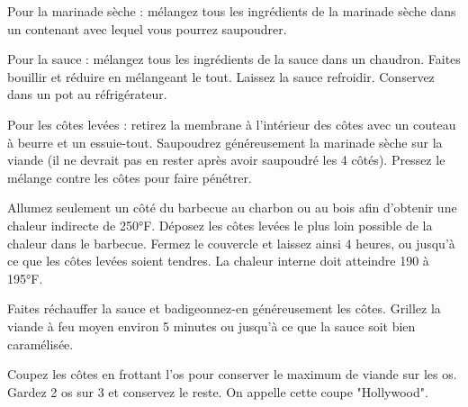 \begin{steps}
    \item Pour la marinade sèche : mélangez tous les ingrédients de la marinade sèche dans un contenant avec lequel vous pourrez saupoudrer.
    \item Pour la sauce : mélangez tous les ingrédients de la sauce dans un chaudron. Faites bouillir et réduire en mélangeant le tout. Laissez la sauce refroidir. Conservez dans un pot au réfrigérateur.
    \item Pour les côtes levées : retirez la membrane à l'intérieur des côtes avec un couteau à beurre et un essuie-tout. Saupoudrez généreusement la marinade sèche sur la viande (il ne devrait pas en rester après avoir saupoudré les 4 côtés). Pressez le mélange contre les côtes pour faire pénétrer.
    \item Allumez seulement un côté du barbecue au charbon ou au bois afin d'obtenir une chaleur indirecte de 250°F. Déposez les côtes levées le plus loin possible de la chaleur dans le barbecue. Fermez le couvercle et laissez ainsi 4 heures, ou jusqu'à ce que les côtes levées soient tendres. La chaleur interne doit atteindre 190 à 195°F.
    \item Faites réchauffer la sauce et badigeonnez-en généreusement les côtes. Grillez la viande à feu moyen environ 5 minutes ou jusqu'à ce que la sauce soit bien caramélisée.
    \item Coupez les côtes en frottant l'os pour conserver le maximum de viande sur les os. Gardez 2 os sur 3 et conservez le reste. On appelle cette coupe "Hollywood".
\end{steps}
